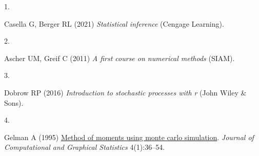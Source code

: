 \documentclass[9pt,twocolumn,twoside,]{pnas-new}
\newlength{\csllabelwidth}
\newlength{\cslhangindent}
\newenvironment{CSLReferences}[2] %
 {%
  \setlength{\parindent}{0pt}
  \ifodd #1 \everypar{\setlength{\hangindent}{\cslhangindent}}\ignorespaces\fi
  \ifnum #2 > 0
  \setlength{\parskip}{#2\baselineskip}
  \fi
 }%
 {}
\newcommand{\CSLLeftMargin}[1]{\parbox[t]{\csllabelwidth}{#1}}
\newcommand{\CSLRightInline}[1]{\parbox[t]{\linewidth - \csllabelwidth}{#1}\break}
\begin{document}
\hypertarget{refs}{}
\begin{CSLReferences}{0}{0}
\leavevmode{}%
\CSLLeftMargin{1. }
\CSLRightInline{Casella G, Berger RL (2021) \emph{Statistical inference}
(Cengage Learning).}

\leavevmode{}%
\CSLLeftMargin{2. }
\CSLRightInline{Ascher UM, Greif C (2011) \emph{A first course on
numerical methods} (SIAM).}

\leavevmode{}%
\CSLLeftMargin{3. }
\CSLRightInline{Dobrow RP (2016) \emph{Introduction to stochastic
processes with r} (John Wiley \& Sons).}

\leavevmode{}%
\CSLLeftMargin{4. }
\CSLRightInline{Gelman A (1995)
\href{http://www.jstor.org/stable/1390626}{Method of moments using monte
carlo simulation}. \emph{Journal of Computational and Graphical
Statistics} 4(1):36--54.}

\end{CSLReferences}



% 
\end{document}
